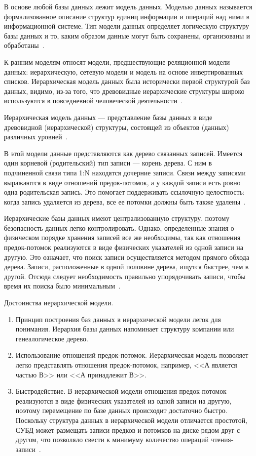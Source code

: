 \documentclass{bmstu}
\begin{document}
В основе любой базы данных лежит модель данных. 
Моделью данных называется формализованное описание структур единиц информации и операций над ними в информационной системе. 
Тип модели данных определяет логическую структуру базы данных и то, каким образом данные могут быть сохранены, организованы и обработаны~\cite{Avrunev2018}.

К ранним моделям относят модели, предшествующие реляционной
модели данных: иерархическую, сетевую модели и модель на основе инвертированных списков. 
Иерархическая модель данных была исторически первой структурой
баз данных, видимо, из-за того, что древовидные иерархические структуры широко используются в повседневной человеческой деятельности~\cite{Avrunev2018}.

Иерархическая модель данных --- представление базы данных в виде древовидной (иерархической) структуры, состоящей из объектов (данных) различных уровней~\cite{Avrunev2018}.

В этой модели данные представляются как дерево связанных записей. 
Имеется один корневой (родительский) тип записи --- корень дерева. 
С ним в подчиненной связи типа 1:N находятся дочерние записи. 
Связи между записями выражаются в виде отношений предок-потомок, а у каждой записи есть ровно одна родительская запись. 
Это помогает поддерживать ссылочную целостность: когда запись удаляется из дерева, все ее потомки должны быть также
удалены~\cite{Avrunev2018}.

Иерархические базы данных имеют централизованную структуру,
поэтому безопасность данных легко контролировать. 
Однако, определенные знания о физическом порядке хранения записей все же необходимы, так как отношения предок-потомок реализуются в виде физических указателей из одной записи на другую. 
Это означает, что поиск записи осуществляется методом прямого обхода дерева. 
Записи, расположенные в одной половине дерева, ищутся быстрее, чем в другой. 
Отсюда следует необходимость правильно упорядочивать записи, чтобы время их поиска было минимальным~\cite{Avrunev2018}.

Достоинства иерархической модели.

\begin{enumerate}
\item Принцип построения баз данных в иерархической модели легок для понимания. 
Иерархия базы данных напоминает структуру компании или генеалогическое дерево.
\item Использование отношений предок-потомок. 
Иерархическая модель позволяет легко представлять отношения предок-потомок, например, <<А является частью В>> или <<А принадлежит В>>.
\item Быстродействие. 
В иерархической модели отношения предок-потомок реализуются в виде физических указателей из одной записи на другую, поэтому перемещение по базе данных происходит достаточно быстро. 
Поскольку структура данных в иерархической модели отличается простотой, СУБД может размещать записи предков и
потомков на диске рядом друг с другом, что позволяло свести к минимуму количество операций чтения-записи~\cite{Avrunev2018}.
\end{enumerate}
\end{document}
